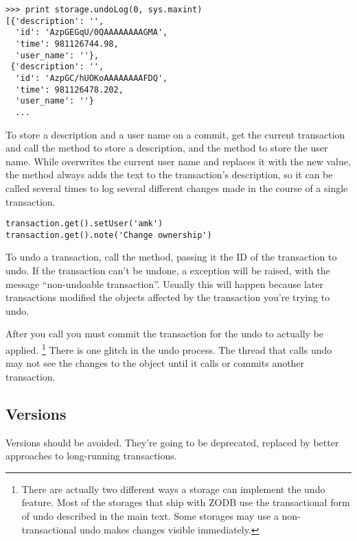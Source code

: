\begin{verbatim}
>>> print storage.undoLog(0, sys.maxint)
[{'description': '',
  'id': 'AzpGEGqU/0QAAAAAAAAGMA',
  'time': 981126744.98,
  'user_name': ''},
 {'description': '',
  'id': 'AzpGC/hUOKoAAAAAAAAFDQ',
  'time': 981126478.202,
  'user_name': ''}
  ...
\end{verbatim}

To store a description and a user name on a commit, get the current
transaction and call the  method to store a
description, and the
 method to store the user name.
While  overwrites the current user name and replaces
it with the new value, the  method always adds the text
to the transaction's description, so it can be called several times to
log several different changes made in the course of a single
transaction.

\begin{verbatim}
transaction.get().setUser('amk')
transaction.get().note('Change ownership')
\end{verbatim}

To undo a transaction, call the  method,
passing it the ID of the transaction to undo.  If the transaction
can't be undone, a  exception
will be raised, with the message ``non-undoable
transaction''.  Usually this will happen because later transactions
modified the objects affected by the transaction you're trying to
undo.

After you call  you must commit the transaction for the
undo to actually be applied.
\footnote{There are actually two different ways a storage can
implement the undo feature.  Most of the storages that ship with ZODB
use the transactional form of undo described in the main text.  Some
storages may use a non-transactional undo makes changes visible
immediately.}  There is one glitch in the undo process.  The thread
that calls undo may not see the changes to the object until it calls
 or commits another transaction.

\subsection{Versions}

\begin{notice}[warning]
  Versions should be avoided.  They're going to be deprecated,
  replaced by better approaches to long-running transactions.
\end{notice}

